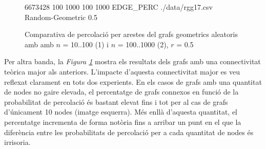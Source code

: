 \documentclass[a4paper]{article}
\begin{document}
\begin{figure}[H]
\begin{minipage}{0.45\textwidth}
			\footnotesize{6673428 100 1000 100 1000 EDGE\_PERC ./data/rgg17.csv Random-Geometric 0.5}
		\end{minipage}
		\caption{Comparativa de percolació per arestes del grafs geometrics aleatoris amb amb $n$ = 10..100 (1) i $n$ = 100..1000 (2), $r$ = 0.5}
		\label{fig:percolation_edges_rgg_0.5}
	\end{figure}
	
	Per altra banda, la \textit{Figura \ref{fig:percolation_edges_rgg_0.5}} mostra els resultats dels grafs amb una connectivitat teòrica major als anteriors. L'impacte d'aquesta connectivitat major es veu reflexat clarament en tots dos experients. En els casos de grafs amb una quantitat de nodes no gaire elevada, el percentatge de grafs connexos en funció de la probabilitat de percolació és bastant elevat fins i tot per al cas de grafs d'únicament 10 nodes (imatge esquerra). Més enllà d'aquesta quantitat, el percentatge incrementa de forma notòria fins a arribar un punt en el que la diferència entre les probabilitats de percolació per a cada quantitat de nodes és irrisoria.
	
\end{document}
